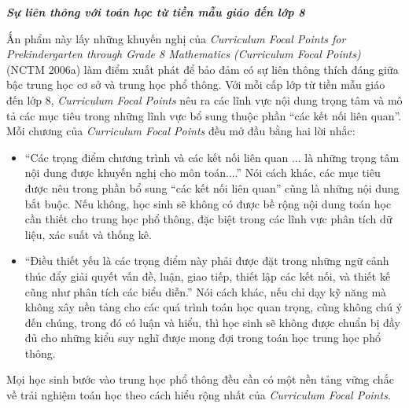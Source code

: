 \documentclass[
  10pt,
  a4paper,
  landscape,
  twoside,
  openany
]{scrbook}
\newcommand{\VI}[1]{#1}
\begin{document}
{
\VI{
\noindent
\textbf{\emph{Sự liên thông với toán học từ tiền mẫu giáo đến lớp 8}}

Ấn phẩm này lấy những khuyến nghị của \emph{Curriculum Focal Points for Prekindergarten through Grade 8 Mathematics (Curriculum Focal Points)} (NCTM 2006a) làm điểm xuất phát để bảo đảm có sự liên thông thích đáng giữa bậc trung học cơ sở và trung học phổ thông. Với mỗi cấp lớp từ tiền mẫu giáo đến lớp 8, \emph{Curriculum Focal Points} nêu ra các lĩnh vực nội dung trọng tâm và mô tả các mục tiêu trong những lĩnh vực bổ sung thuộc phần ``các kết nối liên quan''. Mỗi chương của \emph{Curriculum Focal Points} đều mở đầu bằng hai lời nhắc:

\begin{itemize}
  \item ``Các trọng điểm chương trình và các kết nối liên quan ... là những trọng tâm nội dung được khuyến nghị cho môn toán....'' Nói cách khác, các mục tiêu được nêu trong phần bổ sung ``các kết nối liên quan'' cũng là những nội dung bắt buộc. Nếu không, học sinh sẽ không có được bề rộng nội dung toán học cần thiết cho trung học phổ thông, đặc biệt trong các lĩnh vực phân tích dữ liệu, xác suất và thống kê.
  \item ``Điều thiết yếu là các trọng điểm này phải được đặt trong những ngữ cảnh thúc đẩy giải quyết vấn đề, luận, giao tiếp, thiết lập các kết nối, và thiết kế cũng như phân tích các biểu diễn.'' Nói cách khác, nếu chỉ dạy kỹ năng mà không xây nền tảng cho các quá trình toán học quan trọng, cũng không chú ý đến chúng, trong đó có luận và hiểu, thì học sinh sẽ không được chuẩn bị đầy đủ cho những kiểu suy nghĩ được mong đợi trong toán học trung học phổ thông.
\end{itemize}

Mọi học sinh bước vào trung học phổ thông đều cần có một nền tảng vững chắc về trải nghiệm toán học theo cách hiểu rộng nhất của \emph{Curriculum Focal Points}.

}}
\end{document}

